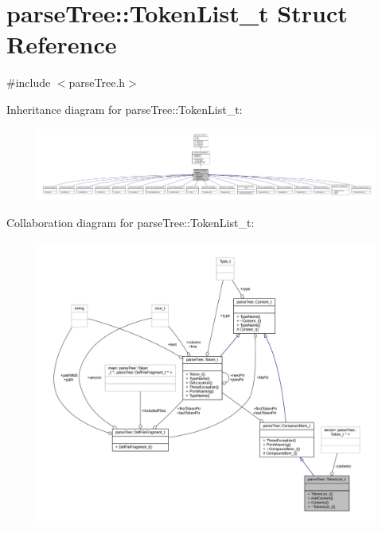 \hypertarget{structparse_tree_1_1_token_list__t}{}\section{parse\+Tree\+:\+:Token\+List\+\_\+t Struct Reference}
\label{structparse_tree_1_1_token_list__t}


{\ttfamily \#include $<$parse\+Tree.\+h$>$}



Inheritance diagram for parse\+Tree\+:\+:Token\+List\+\_\+t\+:
\nopagebreak
\begin{figure}[H]
\begin{center}
\leavevmode
\includegraphics[width=350pt]{structparse_tree_1_1_token_list__t__inherit__graph}
\end{center}
\end{figure}


Collaboration diagram for parse\+Tree\+:\+:Token\+List\+\_\+t\+:
\nopagebreak
\begin{figure}[H]
\begin{center}
\leavevmode
\includegraphics[width=350pt]{structparse_tree_1_1_token_list__t__coll__graph}
\end{center}
\end{figure}
